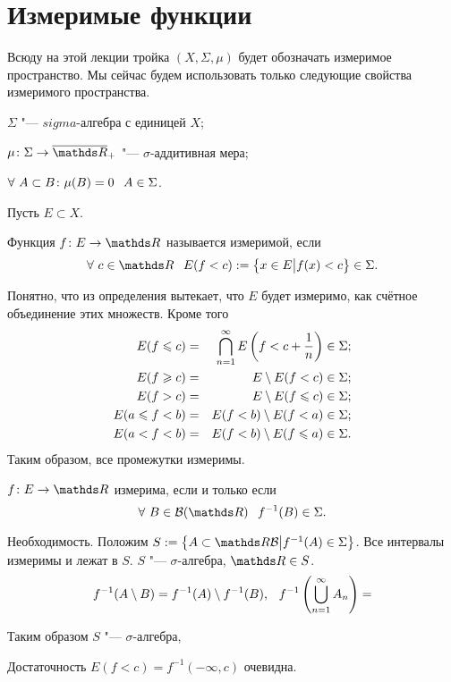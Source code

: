 \section{Измеримые функции} %

Всюду на этой лекции тройка $(X,\Sigma,\mu)$ будет обозначать измеримое пространство. Мы сейчас будем использовать только следующие свойства измеримого пространства.

\begin{roItems}
  \item $\Sigma$ "--- $sigma$-алгебра с единицей $X$;
  \item $\mu\colon \Sigma\to\ol\R_+$ "--- $\sigma$-аддитивная мера;
  \item $\forall\ A\subset B\colon \mu(B)=0\pau A\in\Sigma$.
\end{roItems}

Пусть $E\subset X$.
\begin{Def}
  Функция $f\colon E\to \R$ называется измеримой, если
  \[\forall\ c\in\R\pau E(f<c):=\big\{x\in E\big| f(x)<c\big\}\in\Sigma.\]
\end{Def}

Понятно, что из определения вытекает, что $E$ будет измеримо, как счётное объединение этих множеств. Кроме того
\begin{eqnarray}
  E(f\leqslant c) &=& \bigcap\limits_{n=1}^\infty E\left(f<c+\frac1n\right)\in\Sigma;\\
  E(f\geqslant c) &=& E\setminus E(f<c)\in\Sigma;\\
  E(f>c)     &=& E\setminus E(f\leqslant c)\in\Sigma;\\
  E(a\leqslant f<b)&=& E(f<b)\setminus E(f< a)\in\Sigma;\\
  E(a<f<b)     &=& E(f<b)\setminus E(f\leqslant a)\in\Sigma.
\end{eqnarray}
Таким образом, все промежутки измеримы.

\begin{Lem}
  $f\colon E\to \R$ измерима, если и только если 
  \[\forall\ B\in \mathcal B(\R)\pau f^{-1}(B)\in\Sigma.\]
\end{Lem}

\begin{Proof}
  Необходимость. Положим $S:=\big\{A\subset\R\mathcal B\big|f^{-1}(A)\in\Sigma\big\}$. Все интервалы измеримы и лежат в $S$. $S$ "--- $\sigma$-алгебра, $\R\in S$.
  \[ f^{-1}(A\setminus B) = f^{-1}(A)\setminus f^{-1}(B),\hskip .75em plus.1em minus.08em\relax f^{-1}\left(\bigcup\limits_{n=1}^\infty A_n\right) = 
\]

Таким образом $S$ "--- $\sigma$-алгебра, 

Достаточность $E(f<c)=f^{-1}(-\infty,c)$ очевидна.
\end{Proof}

